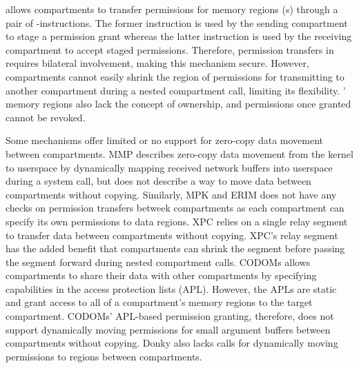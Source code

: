 \seccells allows compartments to transfer permissions for memory 
regions (\cell{}s) through a pair of \scgrant-\screcv instructions.
The former instruction is used by the sending compartment to stage a 
permission grant whereas the latter instruction is used by the receiving
compartment to accept staged permissions.
Therefore, permission transfers in \seccells requires bilateral involvement,
making this mechanism secure.
However, compartments cannot easily shrink the region of permissions
for transmitting to another compartment during a nested compartment call,
limiting its flexibility.
\seccells' memory regions also lack the concept of ownership, and
permissions once granted cannot be revoked.

Some mechanisms offer limited or no support for zero-copy data
movement between compartments.
MMP describes zero-copy data movement from the kernel to userspace
by dynamically mapping received network buffers into userspace
during a  system call, but does not describe a way to
move data between compartments without copying.
Similarly, MPK and ERIM does not have any checks on permission 
transfers betweek compartments as each compartment can specify its 
own permissions to data regions.
XPC relies on a single relay segment to transfer data between
compartments without copying.
XPC's relay segment has the added benefit that compartments
can shrink the segment before passing the segment forward during
nested compartment calls.
CODOMs allows compartments to share their data with other compartments
by specifying capabilities in the access protection lists (APL).
However, the APLs are static and grant access to all of a compartment's
memory regions to the target compartment.
CODOMs' APL-based permission granting, therefore, does not support 
dynamically moving permissions for small argument buffers between
compartments without copying.
Donky also lacks calls for dynamically moving permissions to regions
between compartments.

